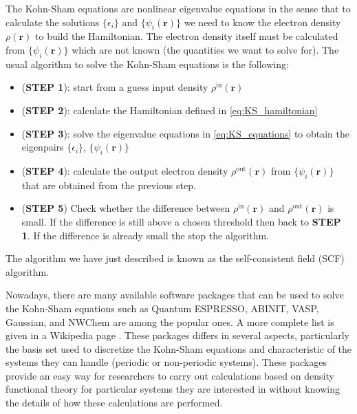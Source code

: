 The Kohn-Sham equations are nonlinear eigenvalue equations in the sense that to calculate the
solutions $\{\epsilon_{i}\}$ and $\{\psi_{i}(\mathbf{r})\}$ we need to know
the electron density $\rho(\mathbf{r})$ to build the Hamiltonian. The electron density
itself must be calculated from $\{\psi_{i}(\mathbf{r})\}$ which are not known (the quantities
we want to solve for). The usual algorithm to solve the Kohn-Sham equations is the following:
\begin{itemize}
\item (\textbf{STEP 1}): start from a guess input density $\rho^{\mathrm{in}}(\mathbf{r})$
\item (\textbf{STEP 2}): calculate the Hamiltonian defined in \eqref{eq:KS_hamiltonian}
\item (\textbf{STEP 3}): solve the eigenvalue equations in \eqref{eq:KS_equations} to obtain the eigenpairs
  $\{\epsilon_{i}\}$, $\{\psi_{i}(\mathbf{r})\}$
\item (\textbf{STEP 4}): calculate the output electron density $\rho^{\mathrm{out}}(\mathbf{r})$
  from $\{\psi_{i}(\mathbf{r})\}$
  that are obtained from the previous step.
\item (\textbf{STEP 5}) Check whether the difference between $\rho^{\mathrm{in}}(\mathbf{r})$
  and $\rho^{\mathrm{out}}(\mathbf{r})$ is small.
  If the difference is still above a chosen threshold then back to \textbf{STEP 1}.
  If the difference is already small the stop the algorithm.
\end{itemize}
The algorithm we have just described is known as the self-consistent field (SCF) algorithm.

Nowadays, there are many available software packages that can be used to solve the Kohn-Sham
equations such as Quantum ESPRESSO, ABINIT, VASP, Gaussian, and NWChem are among the
popular ones. A more complete list is given in a Wikipedia page \cite{wiki-dft-softwares}.
These packages differs in several aspects, particularly the basis set used to discretize
the Kohn-Sham equations and characteristic of the systems they can handle (periodic or non-periodic
systems). These packages provide an easy way for researchers to carry out calculations based
on density functional theory for particular systems they are interested in without knowing the
details of how these calculations are performed.

